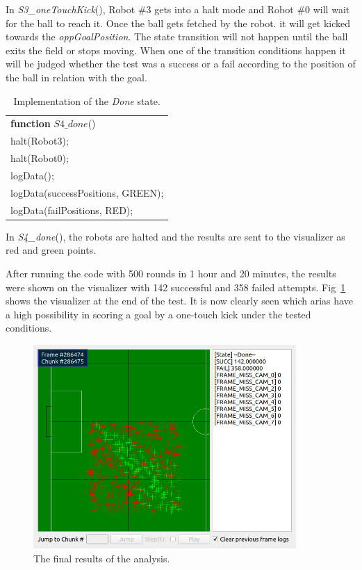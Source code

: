 \documentclass[runningheads]{llncs}
\begin{document}
In \textit{S3\_oneTouchKick}(), Robot \#3 gets into a halt mode and Robot \#0 will wait for the ball to reach it. Once the ball gets fetched by the robot. it will get kicked towards the \textit{oppGoalPosition}. The state transition will not happen until the ball exits the field or stops moving. When one of the transition conditions happen it will be judged whether the test was a success or a fail according to the position of the ball in relation with the goal.

\begin{table}[H]
\caption{Implementation of the \textit{Done} state.}
\center
\label{table_STATE4_IMP}
\begin{tabular}{|p{10cm}|}
\hline

\textbf{function}
$ S4\_done$()\\
\quad halt(Robot3);\\
\quad halt(Robot0);\\
\quad logData();\\
\quad logData(successPositions, GREEN);\\
\quad logData(failPositions, RED);\\

\hline
\end{tabular}
\end{table}

In \textit{S4\_done}(), the robots are halted and the results are sent to the visualizer as red and green points.

After running the code with 500 rounds in 1 hour and 20 minutes, the results were shown on the visualizer with 142 successful and 358 failed attempts. Fig~\ref{fig_ANALYZE_OUTPUT} shows the visualizer at the end of the test. It is now clearly seen which arias have a high possibility in scoring a goal by a one-touch kick under the tested conditions.

\begin{figure}[H]
\centering
\includegraphics[width=10cm]{images/Analyze_output.png}\caption{The final results of the analysis.} \label{fig_ANALYZE_OUTPUT}
\end{figure}
\end{document}
